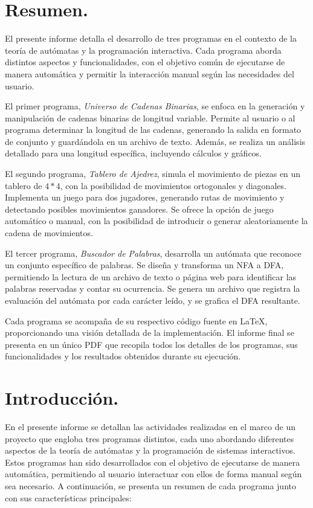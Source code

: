 \documentclass{article}
\begin{document}
\section{Resumen.}
El presente informe detalla el desarrollo de tres programas en el contexto de la teoría de autómatas y la programación interactiva. Cada programa aborda distintos aspectos y funcionalidades, con el objetivo común de ejecutarse de manera automática y permitir la interacción manual según las necesidades del usuario.

El primer programa, \textit{Universo de Cadenas Binarias}, se enfoca en la generación y manipulación de cadenas binarias de longitud
variable. Permite al usuario o al programa determinar la longitud de las cadenas, generando la salida en formato de conjunto y
guardándola en un archivo de texto. Además, se realiza un análisis detallado para una longitud específica, incluyendo cálculos y
gráficos.

El segundo programa, \textit{Tablero de Ajedrez}, simula el movimiento de piezas en un tablero de $4*4$, con la posibilidad de
movimientos ortogonales y diagonales. Implementa un juego para dos jugadores, generando rutas de movimiento y detectando posibles
movimientos ganadores. Se ofrece la opción de juego automático o manual, con la posibilidad de introducir o generar aleatoriamente la
cadena de movimientos.

El tercer programa, \textit{Buscador de Palabras}, desarrolla un autómata que reconoce un conjunto específico de palabras. Se diseña y
transforma un NFA a DFA, permitiendo la lectura de un archivo de texto o página web para identificar las palabras reservadas y contar
su ocurrencia. Se genera un archivo que registra la evaluación del autómata por cada carácter leído, y se grafica el DFA resultante.

Cada programa se acompaña de su respectivo código fuente en LaTeX, proporcionando una visión detallada de la implementación.
El informe final se presenta en un único PDF que recopila todos los detalles de los programas, sus funcionalidades y los resultados
obtenidos durante su ejecución.


\section{Introducción.}
En el presente informe se detallan las actividades realizadas en el marco de un proyecto que engloba tres programas distintos,
cada uno abordando diferentes aspectos de la teoría de autómatas y la programación de sistemas interactivos. Estos programas han
sido desarrollados con el objetivo de ejecutarse de manera automática, permitiendo al usuario interactuar con ellos de forma manual
según sea necesario. A continuación, se presenta un resumen de cada programa junto con sus características principales:
\end{document}
